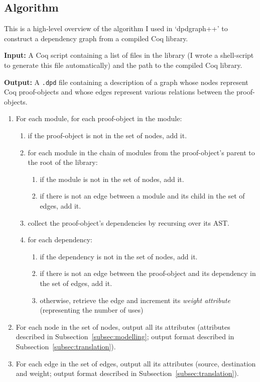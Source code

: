 \subsection{Algorithm}

This is a high-level overview of the algorithm I used in `dpdgraph++' to
construct a dependency graph from a compiled Coq library.

\textbf{Input:} A Coq script containing a list of files in the library (I wrote
a shell-script to generate this file automatically) and the path to the compiled
Coq library.

\textbf{Output:} A \texttt{.dpd} file containing a description of a graph whose
nodes represent Coq proof-objects and whose edges represent various
relations between the proof-objects.

\begin{enumerate}

  \item For each module, for each proof-object in the module:

    \begin{enumerate}
      \item if the proof-object is not in the set of nodes, add it.
      \item for each module in the chain of modules from the proof-object's parent
        to the root of the library: 
        \begin{enumerate}
          \item if the module is not in the set of nodes, add it.
          \item if there is not an edge between a module and its child in the
            set of edges, add it.
        \end{enumerate}
      \item collect the proof-object's dependencies by recursing over its AST.
      \item for each dependency: 
        \begin{enumerate} 
          \item if the dependency is not in the set of nodes, add it.
          \item if there is not an edge between the proof-object and its
            dependency in the set of edges, add it.
          \item otherwise, retrieve the edge and increment its \emph{weight
            attribute} (representing the number of uses)
        \end{enumerate}
    \end{enumerate}
  
  \item For each node in the set of nodes, output all its attributes
    (attributes described in Subsection~\ref{subsec:modelling}; output format described in
    Subsection~\ref{subsec:translation}).

  \item For each edge in the set of edges, output all its attributes (source,
    destination and weight; output format described in
    Subsection~\ref{subsec:translation}).

\end{enumerate}

